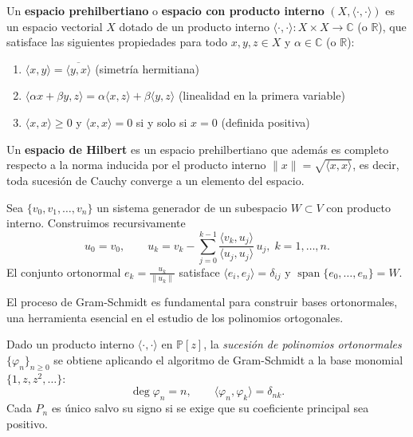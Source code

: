 \begin{definition}\label{def:prehilbert_space}
  Un \textbf{espacio prehilbertiano} o \textbf{espacio con producto interno} $(X, \langle \cdot, \cdot \rangle)$ es un espacio vectorial $X$ dotado de un producto interno $\langle \cdot, \cdot \rangle: X \times X \rightarrow \mathbb{C}$ (o $\mathbb{R}$), que satisface las siguientes propiedades para todo $x, y, z \in X$ y $\alpha \in \mathbb{C}$ (o $\mathbb{R}$):
  \begin{enumerate}
    \item $\langle x, y \rangle = \overline{\langle y, x \rangle}$ (simetría hermitiana)
    \item $\langle \alpha x + \beta y, z \rangle = \alpha \langle x, z \rangle + \beta \langle y, z \rangle$ (linealidad en la primera variable)
    \item $\langle x, x \rangle \geq 0$ y $\langle x, x \rangle = 0$ si y solo si $x = 0$ (definida positiva)
  \end{enumerate}

  Un \textbf{espacio de Hilbert} es un espacio prehilbertiano que además es completo respecto a la norma inducida por el producto interno $\|x\| = \sqrt{\langle x, x \rangle}$, es decir, toda sucesión de Cauchy converge a un elemento del espacio.
\end{definition}

\begin{definition}\label{def:gram-schmidt}
  Sea $\{v_0,v_1,\dots,v_n\}$ un sistema generador de un
  subespacio $W\subset V$ con producto interno.
  Construimos recursivamente
  \[
    u_0=v_0,\qquad
    u_k= v_k-\sum_{j=0}^{k-1}
    \frac{\langle v_k,u_j\rangle}{\langle u_j,u_j\rangle}\,u_j,
    \;k=1,\dots,n.
  \]
  El conjunto ortonormal
  $\displaystyle e_k=\frac{u_k}{\|u_k\|}$ satisface
  $\langle e_i,e_j\rangle=\delta_{ij}$ y
  $\operatorname{span}\{e_0,\dots,e_n\}=W$.
\end{definition}

El proceso de Gram-Schmidt es fundamental para construir bases ortonormales, una herramienta esencial en el estudio de los polinomios ortogonales.

Dado un producto interno $\langle\cdot,\cdot\rangle$ en $\mathbb{P}[z]$,
la \emph{sucesión de polinomios ortonormales}
$\{\varphi_n\}_{n\ge 0}$ se obtiene aplicando
el algoritmo de Gram-Schmidt a la base monomial $\{1,z,z^2,\dots\}$:
\[
  \deg \varphi_n=n,\qquad
  \langle \varphi_n,\varphi_k\rangle=\delta_{nk}.
\]
Cada $P_n$ es único salvo su signo si se exige que su coeficiente principal sea positivo.


